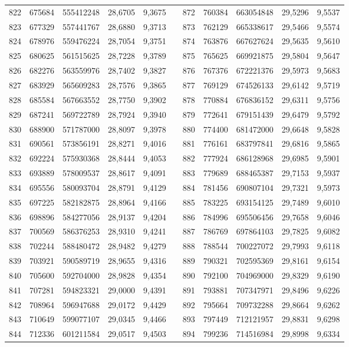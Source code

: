 \begin{longtable}{rrrrrrrrrrr}
822&675684&555412248&28,6705&9,3675&&872&760384&663054848&29,5296&9,5537\\
823&677329&557441767&28,6880&9,3713&&873&762129&665338617&29,5466&9,5574\\
824&678976&559476224&28,7054&9,3751&&874&763876&667627624&29,5635&9,5610\\
825&680625&561515625&28,7228&9,3789&&875&765625&669921875&29,5804&9,5647\\
826&682276&563559976&28,7402&9,3827&&876&767376&672221376&29,5973&9,5683\\
827&683929&565609283&28,7576&9,3865&&877&769129&674526133&29,6142&9,5719\\
828&685584&567663552&28,7750&9,3902&&878&770884&676836152&29,6311&9,5756\\
829&687241&569722789&28,7924&9,3940&&879&772641&679151439&29,6479&9,5792\\
830&688900&571787000&28,8097&9,3978&&880&774400&681472000&29,6648&9,5828\\
831&690561&573856191&28,8271&9,4016&&881&776161&683797841&29,6816&9,5865\\
832&692224&575930368&28,8444&9,4053&&882&777924&686128968&29,6985&9,5901\\
833&693889&578009537&28,8617&9,4091&&883&779689&688465387&29,7153&9,5937\\
834&695556&580093704&28,8791&9,4129&&884&781456&690807104&29,7321&9,5973\\
835&697225&582182875&28,8964&9,4166&&885&783225&693154125&29,7489&9,6010\\
836&698896&584277056&28,9137&9,4204&&886&784996&695506456&29,7658&9,6046\\
837&700569&586376253&28,9310&9,4241&&887&786769&697864103&29,7825&9,6082\\
838&702244&588480472&28,9482&9,4279&&888&788544&700227072&29,7993&9,6118\\
839&703921&590589719&28,9655&9,4316&&889&790321&702595369&29,8161&9,6154\\
840&705600&592704000&28,9828&9,4354&&890&792100&704969000&29,8329&9,6190\\
841&707281&594823321&29,0000&9,4391&&891&793881&707347971&29,8496&9,6226\\
842&708964&596947688&29,0172&9,4429&&892&795664&709732288&29,8664&9,6262\\
843&710649&599077107&29,0345&9,4466&&893&797449&712121957&29,8831&9,6298\\
844&712336&601211584&29,0517&9,4503&&894&799236&714516984&29,8998&9,6334\\

\end{longtable}
